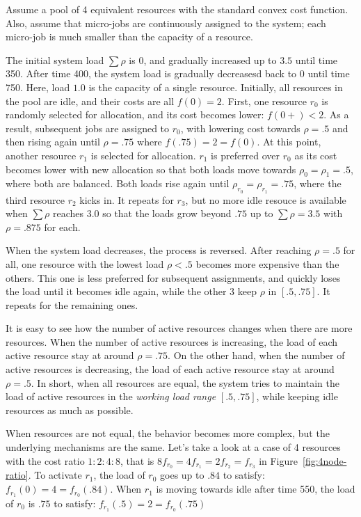 Assume a pool of 4 equivalent resources with the standard convex
cost function.
Also, assume that micro-jobs are continuously assigned to the
system; each micro-job is much smaller than the capacity of a
resource.

The initial system load $\sum \rho$ is $0$, and gradually increased up
to $3.5$ until time 350. After time 400, the system load is gradually
decreasesd back to $0$ until time 750.
Here, load $1.0$ is the capacity of a single resource. 
Initially, all resources in the pool are idle, and their costs are
all $f(0)= 2$.
First, one resource $r_{0}$ is randomly selected for allocation, and its
cost becomes lower: $f(0+) < 2$. As a result, subsequent jobs are
assigned to $r_{0}$, with lowering cost towards $\rho = .5$ and then
rising again until $\rho = .75$ where $f(.75) = 2 = f(0)$.
At this point, another resource $r_{1}$ is selected for allocation.
$r_{1}$ is preferred over $r_{0}$ as its cost becomes lower with new
allocation so that both loads move towards $\rho_{0} = \rho_{1} = .5$,
where both are balanced.
Both loads rise again until $\rho_{r_{0}} = \rho_{r_{1}} = .75$,
where the third resource $r_{2}$ kicks in.
It repeats for $r_{3}$, but no more idle resouce is available
when $\sum \rho$ reaches $3.0$ so that the loads grow beyond $.75$
up to $\sum \rho = 3.5$ with $\rho = .875$ for each.

When the system load decreases, the process is reversed.
After reaching $\rho = .5$ for all,
one resource with the lowest load $\rho < .5$ becomes more expensive
than the others.
This one is less preferred for subsequent assignments, and quickly
loses the load until it becomes idle again, while the other 3 keep
$\rho$ in $[.5, .75]$. It repeats for the remaining ones.

It is easy to see how the number of active resources changes when
there are more resources.
When the number of active resources is increasing, the load of each
active resource stay at around $\rho = .75$.
On the other hand, when the number of active resources is decreasing,
the load of each active resource stay at around $\rho = .5$.
In short, when all resources are equal, the system tries to maintain
the load of active resources in the {\em working load range}
$[.5, .75]$, while keeping idle resources as much as possible.

When resources are not equal, the behavior becomes more complex, but
the underlying mechanisms are the same.
Let's take a look at a case of 4 resources with the cost ratio $1:2:4:8$,
that is $8 f_{r_{0}} = 4 f_{r_{1}} = 2 f_{r_{2}} = f_{r_{3}}$ in
Figure~\ref{fig:4node-ratio}.
To activate $r_{1}$, the load of $r_{0}$ goes up to $.84$ to satisfy:
$f_{r_{1}}(0) = 4 = f_{r_{0}}(.84)$.
When $r_{1}$ is moving towards idle after time 550, the load
of $r_{0}$ is $.75$ to satisfy: $f_{r_{1}}(.5) = 2 = f_{r_{0}}(.75)$

